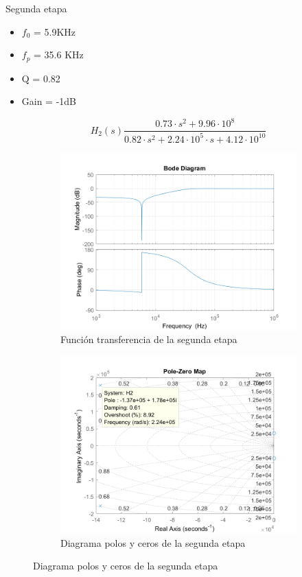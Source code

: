 \documentclass[../../tc_tp5_main.tex]{subfiles}
\begin{document}
Segunda etapa
\begin{itemize}
	\item $f_0$ = 5.9KHz 
	\item $f_p$ = 35.6 KHz
	\item Q = 0.82
	\item Gain = -1dB
\end{itemize}

\begin{equation}
H_2(s)\frac{0.73\cdot s^2+9.96\cdot 10^{8}}{0.82\cdot s^2+2.24\cdot 10^5\cdot s + 4.12\cdot 10^{10}}
\end{equation}

\begin{figure}[H]	%
	\centering
	\begin{subfigure}[t]{0.7\textwidth}
		\centering
		\includegraphics[width=\textwidth]{imagenes/bode_etapa_2_calculo_pablo.png}
		\caption{Funci\'on transferencia de la segunda etapa}
		\label{fig:ej3_H2_ideal}
	\end{subfigure}%
	\hfill%
	\begin{subfigure}[t]{0.7\textwidth}
		\centering
		\includegraphics[width=\textwidth]{imagenes/pz_etapa_2.png}
		\caption{Diagrama polos y ceros de la segunda etapa}
		\label{fig:ej3_pz_etapa_2}
	\end{subfigure}
\end{figure}
\end{document}
